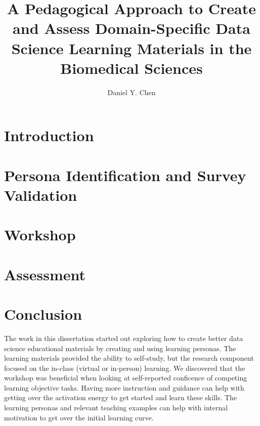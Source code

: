 \documentclass[doublespace,draft,nopageskip]{VTthesis} %
\title{A Pedagogical Approach
       to Create and Assess
       Domain-Specific
       Data Science Learning Materials
       in the Biomedical Sciences}
\author{Daniel Y. Chen}
\begin{document}
  \frontmatter
  \maketitle
  \tableofcontents

	\listoffigures
	\listoftables
    \printnomenclature %
    

	\mainmatter

	\chapter{Introduction} \label{ch:introduction}
        

    \chapter{Persona Identification and Survey Validation} \label{ch:persona_validation}
        

    \chapter{Workshop} \label{ch:workshop}
        

    \chapter{Assessment} \label{ch:assessment}
        

    \chapter{Conclusion} \label{ch:conclusion}

        The work in this dissertation started out exploring how to create better data science educational materials
        by creating and using learning personas.
        The learning materials provided the ability to self-study,
        but the research component focused on the in-class (virtual or in-person) learning.
        We discovered that the workshop was beneficial when looking at self-reported conficence of competing learning objective tasks.
        Having more instruction and guidance can help with getting over the activation energy to get started and learn these skills.
        The learning personas and relevant teaching examples can help with internal motivation
        to get over the initial learning curve.
\end{document}
